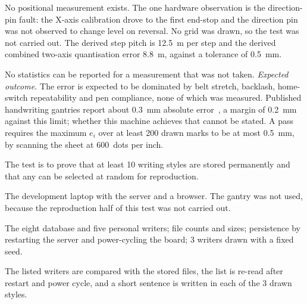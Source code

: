 
            No positional measurement exists.
            The one hardware observation is the direction-pin fault: the X-axis calibration drove to the first end-stop and the direction pin was not observed to change level on reversal. No grid was drawn, so the test was not carried out. The derived step pitch is 12.5~\textmu m per step and the derived combined two-axis quantisation error 8.8~\textmu m, against a tolerance of 0.5~mm.


            No statistics can be reported for a measurement that was not taken.
            \emph{Expected outcome.}
            The error is expected to be dominated by belt stretch, backlash, home-switch repeatability and pen compliance, none of which was measured.
            Published handwriting gantries report about 0.3~mm absolute error~\cite{huang2024}, a margin of 0.2~mm against this limit; whether this machine achieves that cannot be stated.
            A pass requires the maximum $e_i$ over at least 200 drawn marks to be at most 0.5~mm, by scanning the sheet at 600~dots per inch.


\medskip
\label{sec:res-qtp6}


            The test is to prove that at least 10 writing styles are stored permanently and that any can be selected at random for reproduction.


            The development laptop with the server and a browser. The gantry was not used, because the reproduction half of this test was not carried out.


            The eight database and five personal writers; file counts and sizes; persistence by restarting the server and power-cycling the board; 3 writers drawn with a fixed seed.


            The listed writers are compared with the stored files, the list is re-read after restart and power cycle, and a short sentence is written in each of the 3 drawn styles.

